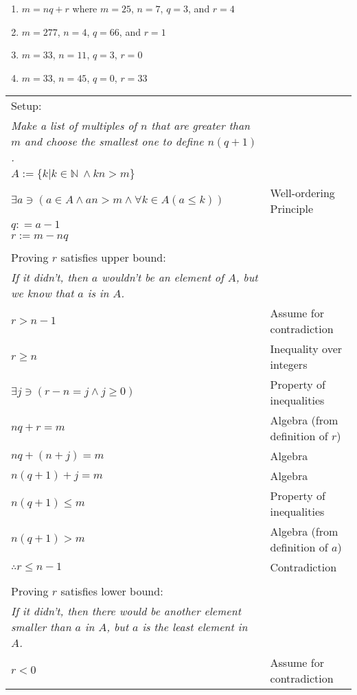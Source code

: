 \item
\begin{enumerate}
\item $m = nq + r$ where $m = 25$, $n = 7$, $q = 3$, and $r = 4$
\item $m = 277$, $n = 4$, $q = 66$, and $r = 1$
\item $m = 33$, $n = 11$, $q = 3$, $r = 0$
\item $m = 33$, $n = 45$, $q = 0$, $r = 33$
\end{enumerate}

\item 
\begin{tabular}[t]{p{4 in} l}
Setup: \\
\textit{Make a list of multiples of $n$ that are greater than $m$ and choose the smallest one to define $n(q + 1)$.} \\
$A := \{k | k \in \mathbb{N}\ \wedge kn > m \}$ &  \\
$\exists a \ni (a \in A \wedge an > m \wedge \forall k \in A (a \leq k))$ & Well-ordering Principle \\
$q : = a - 1 $ &  \\
$r := m - nq$ &  \\
\\
Proving $r$ satisfies upper bound: \\
\textit{If it didn't, then $a$ wouldn't be an element of $A$, but we know that $a$ is in $A$.} \\
$r > n - 1$ & Assume for contradiction \\
$r \geq n$ & Inequality over integers \\
$\exists j \ni (r - n = j \wedge j \geq 0)$ & Property of inequalities \\
$nq + r = m $ & Algebra (from definition of $r$) \\
$nq + (n + j) = m$ & Algebra \\
$n(q + 1) + j = m$ & Algebra \\
$n(q + 1) \leq m$ & Property of inequalities \\
$n(q + 1) > m$ & Algebra (from definition of $a$) \\
$\therefore r \leq n - 1$ & Contradiction \\
\\
Proving $r$ satisfies lower bound: \\
\textit{If it didn't, then there would be another element smaller than $a$ in $A$, but $a$ is the least element in $A$.} \\
$r < 0$ & Assume for contradiction \\

\end{tabular}
